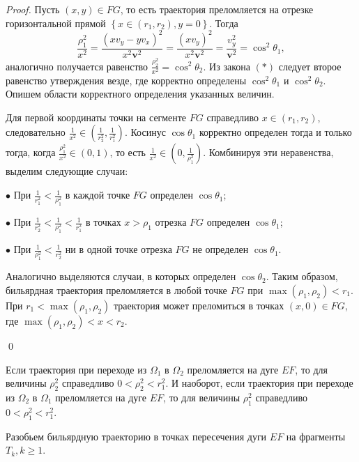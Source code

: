 \begin{proof}
Пусть $(x,y) \in FG$, то есть траектория преломляется на отрезке горизонтальной прямой $\left\{ x \in (r_1,r_2), y=0 \right\}$. Тогда 
$$\frac{\rho_1^2}{x^2} = \frac{(x v_y-y v_x)^2}{x^2 \textbf{v}^2} = \frac{(x v_y)^2}{x^2 \textbf{v}^2} = \frac{v_y^2}{\textbf{v}^2} = \cos^2\theta_1, $$
аналогично получается равенство $\frac{\rho_2^2}{x^2} = \cos^2 \theta_2$. Из закона $(\ast)$ следует второе равенство утверждения везде, где корректно определены $\cos^2 \theta_1$ и $\cos^2 \theta_2$.
Опишем области корректного определения указанных величин.

Для первой координаты точки на сегменте $FG$ справедливо $x \in (r_1, r_2)$, следовательно $\frac{1}{x^2} \in (\frac{1}{r_2^2}, \frac{1}{r_1^2})$.
Косинус $\cos \theta_1$ корректно определен тогда и только тогда, когда $\frac{\rho_1^2}{x^2} \in (0,1)$, то есть $\frac{1}{x^2} \in (0,\frac{1}{\rho_1^2})$.
Комбинируя эти неравенства, выделим следующие случаи:

$\bullet$ При $\frac{1}{r_1^2} < \frac{1}{\rho_1^2}$ в каждой точке $FG$ определен $\cos \theta_1$;

$\bullet$ При $\frac{1}{r_2^2} < \frac{1}{\rho_1^2} < \frac{1}{r_1^2}$ в точках $x > \rho_1$ отрезка $FG$ определен $\cos \theta_1$;

$\bullet$ При $\frac{1}{\rho_1^2} < \frac{1}{r_2^2}$ ни в одной точке отрезка  $FG$ не определен $\cos \theta_1$.

Аналогично выделяются случаи, в которых определен $\cos \theta_2$. 
Таким образом, бильярдная траектория преломляется в любой точке $FG$ при $\max( \rho_1, \rho_2) < r_1$. При $r_1 < \max( \rho_1, \rho_2)$ траектория может преломиться в точках $(x,0) \in FG$, где $\max( \rho_1, \rho_2)  <x < r_2$. 

\qed
\end{proof}

\begin{remark}
Если траектория при переходе из $\Omega_1$ в $\Omega_2$ преломляется на дуге $EF$, то для величины $\rho_2^2$ справедливо $0 < \rho_2^2 < r_1^2$. 
И наоборот, если траектория при переходе из $\Omega_2$ в $\Omega_1$  преломляется на дуге $EF$, то для величины $\rho_1^2$ справедливо $0 < \rho_1^2 < r_1^2$. 
\label{cons:branching_zone_origins}
\end{remark}

Разобьем бильярдную траекторию в точках пересечения дуги $EF$ на фрагменты $T_k, k \geq 1$. 


